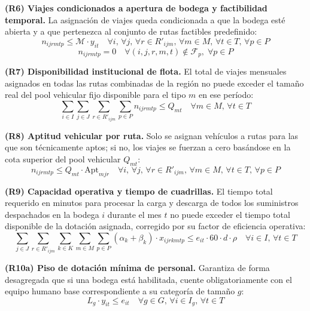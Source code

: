 \documentclass[letterpaper]{article}
\begin{document}
\begin{flushleft}
\textbf{(R6) Viajes condicionados a apertura de bodega y factibilidad temporal.} La asignación de viajes queda condicionada a que la bodega esté abierta y a que pertenezca al conjunto de rutas factibles predefinido:
\begin{equation}
n_{ijrmtp} \leq \mathcal{M} \cdot y_{it}
\quad \forall i,\, \forall j,\, \forall r \in R'_{ijm},\, \forall m \in M,\, \forall t \in T,\, \forall p \in P
\end{equation}
\begin{equation*}
n_{ijrmtp} = 0 \quad \forall (i,j,r,m,t) \notin \mathcal{F}_p,\; \forall p \in P
\end{equation*}

\textbf{(R7) Disponibilidad institucional de flota.} El total de viajes mensuales asignados en todas las rutas combinadas de la región no puede exceder el tamaño real del pool vehicular fijo disponible para el tipo $m$ en ese período:
\begin{equation}
\sum_{i \in I} \sum_{j \in J} \sum_{r \in R'_{ijm}} \sum_{p \in P} n_{ijrmtp} \leq Q_{mt}
\quad \forall m \in M,\, \forall t \in T
\end{equation}

\textbf{(R8) Aptitud vehicular por ruta.} Solo se asignan vehículos a rutas para las que son técnicamente aptos; si no, los viajes se fuerzan a cero basándose en la cota superior del pool vehicular $Q_{mt}$:
\begin{equation}
n_{ijrmtp} \leq Q_{mt} \cdot \mathrm{Apt}_{mjr}
\quad \forall i,\, \forall j,\, \forall r \in R'_{ijm},\, \forall m \in M,\, \forall t \in T,\, \forall p \in P
\end{equation}

\textbf{(R9) Capacidad operativa y tiempo de cuadrillas.} El tiempo total requerido en minutos para procesar la carga y descarga de todos los suministros despachados en la bodega $i$ durante el mes $t$ no puede exceder el tiempo total disponible de la dotación asignada, corregido por su factor de eficiencia operativa:
\begin{equation}
\sum_{j \in J} \sum_{r \in R'_{ijm}} \sum_{k \in K} \sum_{m \in M} \sum_{p \in P} (\alpha_k + \beta_k) \cdot x_{ijrkmtp}
\leq e_{it} \cdot 60 \cdot d \cdot \rho
\quad \forall i \in I,\, \forall t \in T
\end{equation}

\textbf{(R10a) Piso de dotación mínima de personal.} Garantiza de forma desagregada que si una bodega está habilitada, cuente obligatoriamente con el equipo humano base correspondiente a su categoría de tamaño $g$:
\begin{equation}
L_g \cdot y_{it} \leq e_{it} \quad \forall g \in G,\, \forall i \in I_g,\, \forall t \in T
\end{equation}


\end{flushleft}
\end{document}
